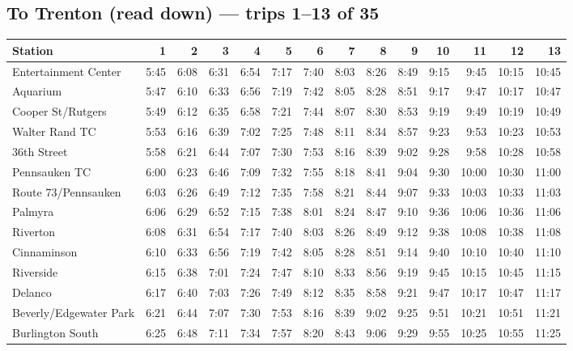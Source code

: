 \subsection*{To Trenton (read down) --- trips 1--13 of 35}
\begin{center}\footnotesize\setlength{\tabcolsep}{3pt}\begin{tabular}{@{}lrrrrrrrrrrrrr@{}}\toprule
Station & 1 & 2 & 3 & 4 & 5 & 6 & 7 & 8 & 9 & 10 & 11 & 12 & 13 \\\midrule
Entertainment Center & 5:45 & 6:08 & 6:31 & 6:54 & 7:17 & 7:40 & 8:03 & 8:26 & 8:49 & 9:15 & 9:45 & 10:15 & 10:45 \\
Aquarium & 5:47 & 6:10 & 6:33 & 6:56 & 7:19 & 7:42 & 8:05 & 8:28 & 8:51 & 9:17 & 9:47 & 10:17 & 10:47 \\
Cooper St/Rutgers & 5:49 & 6:12 & 6:35 & 6:58 & 7:21 & 7:44 & 8:07 & 8:30 & 8:53 & 9:19 & 9:49 & 10:19 & 10:49 \\
Walter Rand TC & 5:53 & 6:16 & 6:39 & 7:02 & 7:25 & 7:48 & 8:11 & 8:34 & 8:57 & 9:23 & 9:53 & 10:23 & 10:53 \\
36th Street & 5:58 & 6:21 & 6:44 & 7:07 & 7:30 & 7:53 & 8:16 & 8:39 & 9:02 & 9:28 & 9:58 & 10:28 & 10:58 \\
Pennsauken TC & 6:00 & 6:23 & 6:46 & 7:09 & 7:32 & 7:55 & 8:18 & 8:41 & 9:04 & 9:30 & 10:00 & 10:30 & 11:00 \\
Route 73/Pennsauken & 6:03 & 6:26 & 6:49 & 7:12 & 7:35 & 7:58 & 8:21 & 8:44 & 9:07 & 9:33 & 10:03 & 10:33 & 11:03 \\
Palmyra & 6:06 & 6:29 & 6:52 & 7:15 & 7:38 & 8:01 & 8:24 & 8:47 & 9:10 & 9:36 & 10:06 & 10:36 & 11:06 \\
Riverton & 6:08 & 6:31 & 6:54 & 7:17 & 7:40 & 8:03 & 8:26 & 8:49 & 9:12 & 9:38 & 10:08 & 10:38 & 11:08 \\
Cinnaminson & 6:10 & 6:33 & 6:56 & 7:19 & 7:42 & 8:05 & 8:28 & 8:51 & 9:14 & 9:40 & 10:10 & 10:40 & 11:10 \\
Riverside & 6:15 & 6:38 & 7:01 & 7:24 & 7:47 & 8:10 & 8:33 & 8:56 & 9:19 & 9:45 & 10:15 & 10:45 & 11:15 \\
Delanco & 6:17 & 6:40 & 7:03 & 7:26 & 7:49 & 8:12 & 8:35 & 8:58 & 9:21 & 9:47 & 10:17 & 10:47 & 11:17 \\
Beverly/Edgewater Park & 6:21 & 6:44 & 7:07 & 7:30 & 7:53 & 8:16 & 8:39 & 9:02 & 9:25 & 9:51 & 10:21 & 10:51 & 11:21 \\
Burlington South & 6:25 & 6:48 & 7:11 & 7:34 & 7:57 & 8:20 & 8:43 & 9:06 & 9:29 & 9:55 & 10:25 & 10:55 & 11:25 \\

\end{tabular}
\end{center}
